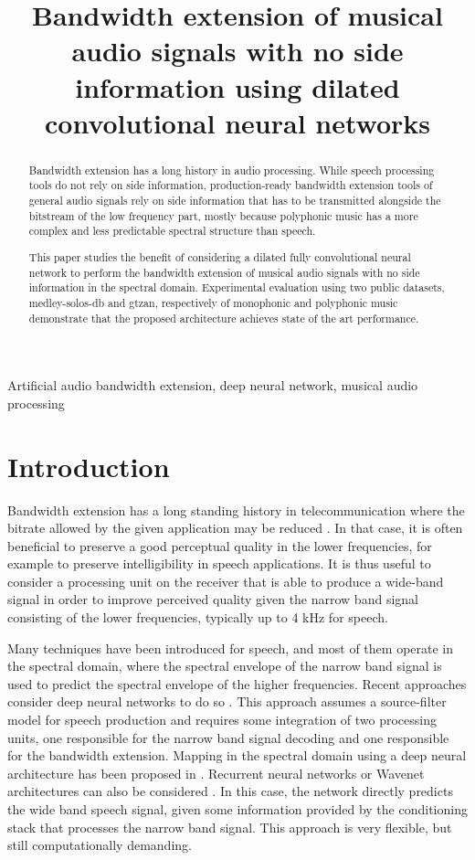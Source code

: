 \documentclass{article}
\title{Bandwidth extension of musical audio signals with no side information using dilated convolutional neural networks}
\begin{document}
%
\maketitle
%
\begin{abstract}

Bandwidth extension has a long history in audio processing. While speech processing tools do not rely on side information, production-ready bandwidth extension tools of general audio signals rely on side information that has to be transmitted alongside the bitstream of the low frequency part, mostly because polyphonic music has a more complex and less predictable spectral structure than speech.

This paper studies the benefit of considering a dilated fully convolutional neural network to perform the bandwidth extension of musical audio signals with no side information in the spectral domain. Experimental evaluation using two public datasets, medley-solos-db and gtzan, respectively of monophonic and polyphonic music demonstrate that the proposed architecture achieves state of the art performance.

\end{abstract}
%
\begin{keywords}
Artificial audio bandwidth extension, deep neural network, musical audio processing
\end{keywords}
%
\section{Introduction}
\label{sec:intro}

Bandwidth extension has a long standing history in telecommunication where the bitrate allowed by the given application may be reduced \cite{larsen2005audio}. In that case, it is often beneficial to preserve a good perceptual quality in the lower frequencies, for example to preserve intelligibility in speech applications. It is thus useful to consider a processing unit on the receiver that is able to produce a wide-band signal in order to improve perceived quality given the narrow band signal consisting of the lower frequencies, typically up to 4 kHz for speech.

Many techniques have been introduced for speech, and most of them operate in the spectral domain, where the spectral envelope of the narrow band signal is used to predict the spectral envelope of the higher frequencies. Recent approaches consider deep neural networks to do so \cite{abel2017artificial}. This approach assumes a source-filter model for speech production and requires some integration of two processing units, one responsible for the narrow band signal decoding and one responsible for the bandwidth extension. Mapping in the spectral domain using a deep neural architecture has been proposed in \cite{li2015deep}. Recurrent neural networks \cite{ling2018waveform} or Wavenet architectures can also be considered \cite{gupta2019speech}. In this case, the network directly predicts the wide band speech signal, given some information provided by the conditioning stack that processes the narrow band signal. This approach is very flexible, but still computationally demanding.
\end{document}
